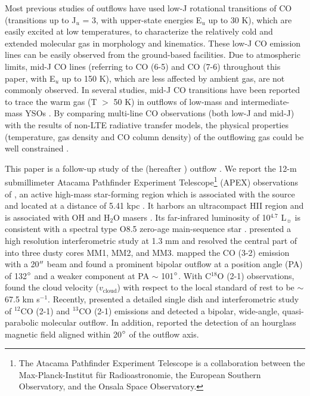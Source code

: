 Most previous studies of outflows have used low-J rotational transitions of CO (transitions up to J$_u$ = 3, with upper-state energies E$_u$ up to 30 K), which are easily excited at low temperatures, to characterize the relatively cold and extended molecular gas in morphology and kinematics. These low-J CO emission lines can be easily observed from the ground-based facilities. Due to atmospheric limits, mid-J CO lines (referring to CO (6-5) and CO (7-6) throughout this paper, with  E$_u$ up to 150 K), which are less affected by ambient gas, are not commonly observed. In several studies, mid-J CO transitions have been reported to trace the warm gas (T $>$ 50 K) in outflows of low-mass and intermediate-mass YSOs \citep{2009A&A...501..633V, 2009A&A...507.1425V, 2012A&A...542A..86Y, 2016A&A...587A..17V}.  By comparing multi-line CO observations (both low-J and mid-J) with the results of non-LTE radiative transfer models, the physical properties (temperature, gas density and CO column density) of the outflowing gas could be well constrained \citep{2015A&A...581A...4L}. 

This paper is a follow-up study of the  (hereafter ) outflow \citep{2009ApJ...696...66Q}. We report the 12-m submillimeter Atacama Pathfinder Experiment Telescope\footnote{    The Atacama Pathfinder Experiment Telescope is a collaboration between the Max-Planck-Institut f{\"u}r Radioastronomie, the European Southern Observatory, and the Onsala Space Observatory.} (APEX) observations of , an active high-mass star-forming region which is associated with the source  and located at a distance of 5.41 kpc \citep{2015PASJ...67...69S}. It harbors an ultracompact HII region and is associated with OH and H$_2$O masers \citep{1993AJ....105.1495H, 1997MNRAS.289..203C, 1998AJ....116.1897M, 1999ApJS..123..487M, 2003MNRAS.341..551C}. Its far-infrared luminosity of 10$^{4.7}$ L$_\sun$ is consistent with a spectral type O8.5 zero-age main-sequence star \citep{1998AJ....116.1897M}. \citet{2009ApJ...696...66Q} presented a high resolution interferometric study at 1.3 mm and resolved the central part of  into three dusty cores MM1, MM2, and MM3. \citet{2003A&A...412..175K} mapped the CO (3-2) emission with a 20${\mbox{$^{\prime\prime}$}}$ beam and found a prominent bipolar outflow at a position angle (PA) of 132${\mbox{$^\circ$}}$ and a weaker component at PA $\sim$ 101${\mbox{$^\circ$}}$. With C$^{18}$O (2-1) observations, \citet{2003A&A...412..175K} found the cloud velocity ($v_{\mathrm{cloud}}$) with respect to the local standard of rest to be $\sim$ 67.5 km s$^{-1}$. Recently, \citet{2009ApJ...696...66Q} presented a detailed single dish and interferometric study of $^{12}$CO (2-1) and $^{13}$CO (2-1) emissions and detected a bipolar, wide-angle, quasi-parabolic molecular outflow. In addition, \citet{2014ApJ...794L..18Q} reported the detection of an hourglass magnetic field aligned within 20${\mbox{$^\circ$}}$ of the outflow axis.

